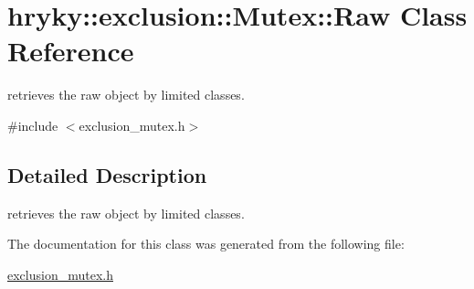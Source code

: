 \hypertarget{classhryky_1_1exclusion_1_1_mutex_1_1_raw}{\section{hryky\-:\-:exclusion\-:\-:Mutex\-:\-:Raw Class Reference}
\label{classhryky_1_1exclusion_1_1_mutex_1_1_raw}
}


retrieves the raw object by limited classes.  




{\ttfamily \#include $<$exclusion\-\_\-mutex.\-h$>$}



\subsection{Detailed Description}
retrieves the raw object by limited classes. 

The documentation for this class was generated from the following file\-:\begin{DoxyCompactItemize}
\item 
\hyperlink{exclusion__mutex_8h}{exclusion\-\_\-mutex.\-h}\end{DoxyCompactItemize}
